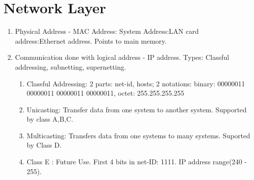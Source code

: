 \documentclass[a4paper,oneside]{book}
\begin{document}
\chapter{Network Layer}
\begin{enumerate}
\item Physical Address - MAC Address: System Address:LAN card address:Ethernet address. Points to main memory.
\item Communication done with logical address - IP address. Types: Classful addressing, subnetting, supernetting.
\begin{enumerate}
\item Classful Addressing: 2 parts: net-id, hosts; 2 notations: binary: 00000011 00000011 00000011 00000011, octet: 255.255.255.255
\item Unicasting: Transfer data from one system to another system. Supported by class A,B,C.
\item Multicasting: Transfers data from one systems to many systems. Suported by Class D.
\item Class E : Future Use. First 4 bits in net-ID: 1111. IP address range(240 - 255). 
\end{enumerate}
\end{enumerate}
\end{document}
